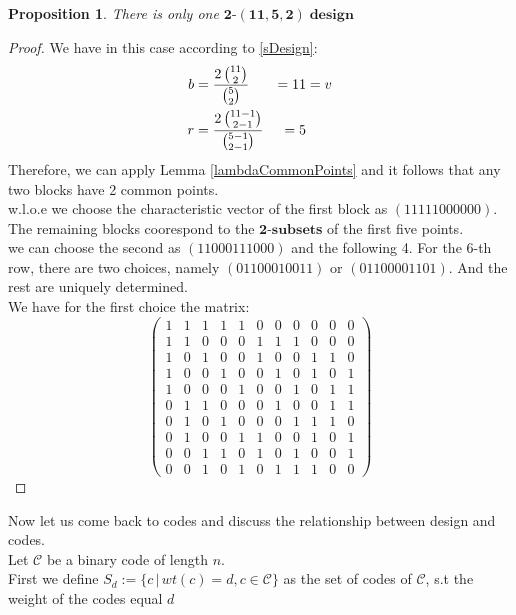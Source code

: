 \documentclass{article}
\newtheorem{prop}[theorem]{Proposition}
\numberwithin{equation}{theorem}
\newcommand{\tParamDesign}[4]{\ensuremath{\bm{#1\mbox{-}(#2,#3,#4)\; design}}}
\newcommand{\cCodes}{\ensuremath{\mathscr{C}}}
\newcommand{\tSubset}[1]{\ensuremath{\bm{#1\mbox{-}{subset}}}}
\newcommand{\wloe}{w.l.o.e}
\begin{document}
\begin{prop}
There is only one \tParamDesign{2}{11}{5}{2}
\end{prop}
\begin{proof}
We have in this case according to \eqref{sDesign}:
\begin{alignat}{3}
	b &= \frac{2\,\binom{11}{2}}{\binom{5}{2}} & = 11 &= v \notag\\
	r &= \frac{2 \, \binom{11-1}{2 - 1}}{\binom{5-1}{2 - 1}} & = 5 & \notag\phantom{v} 
\end{alignat}
Therefore, we can apply Lemma \ref{lambdaCommonPoints} and it follows that any two blocks have 2 common points.\\
{\wloe} we choose the characteristic vector of the first block as 
$(1 1 1 1 1 0 0 0 0 0 0)$. The remaining blocks coorespond to the {\tSubset{2}}\textbf{s} of the first five points.\\
we can choose the second as $(1 1 0 0 0 1 1 1 0 0 0)$ and the following 4. For the $6$-th row, there are two choices, namely
$(0 1 1 0 0 0 1 0 0 1 1)$ or $(0 1 1 0 0 0 0 1 1 0 1)$. And the rest are uniquely determined. \\
We have for the first choice the matrix:
\[
	\begin{pmatrix}
 1 & 1 & 1 & 1 & 1 & 0 & 0 & 0 & 0 & 0 & 0 \\
 1 & 1 & 0 & 0 & 0 & 1 & 1 & 1 & 0 & 0 & 0 \\
 1 & 0 & 1 & 0 & 0 & 1 & 0 & 0 & 1 & 1 & 0 \\
 1 & 0 & 0 & 1 & 0 & 0 & 1 & 0 & 1 & 0 & 1 \\
 1 & 0 & 0 & 0 & 1 & 0 & 0 & 1 & 0 & 1 & 1 \\
 0 & 1 & 1 & 0 & 0 & 0 & 1 & 0 & 0 & 1 & 1 \\
 0 & 1 & 0 & 1 & 0 & 0 & 0 & 1 & 1 & 1 & 0 \\
 0 & 1 & 0 & 0 & 1 & 1 & 0 & 0 & 1 & 0 & 1 \\
 0 & 0 & 1 & 1 & 0 & 1 & 0 & 1 & 0 & 0 & 1 \\
 0 & 0 & 1 & 0 & 1 & 0 & 1 & 1 & 1 & 0 & 0 
	\end{pmatrix}
\]
\end{proof}
Now let us come back to codes and discuss the relationship between design and codes.\\
Let {\cCodes} be a binary code of length $n$.\\
First we define $S_d := \{c\,|\,wt(c) = d, c \in \cCodes\}$ as the set of codes of \cCodes, s.t the weight of the codes equal $d$
\end{document}
